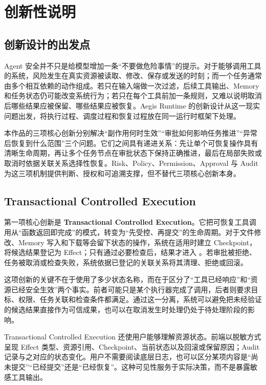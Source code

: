 \chapter{创新性说明}

\section{创新设计的出发点}

Agent 安全并不只是给模型增加一条“不要做危险事情”的提示。对于能够调用工具的系统，风险发生在真实资源被读取、修改、保存或发送的时刻；而一个任务通常由多个相互依赖的动作组成。若只在输入端做一次过滤，后续工具输出、Memory 和任务状态仍可能改变系统行为；若只在每个工具前加一条规则，又难以说明取消后哪些结果应被保留、哪些结果应被恢复。Aegis Runtime 的创新设计从这一现实问题出发，将执行过程、调度过程和恢复过程放在同一运行时框架下处理。

本作品的三项核心创新分别解决“副作用何时生效”“审批如何影响任务推进”“异常后恢复到什么范围”三个问题。它们之间具有递进关系：先让单个可恢复操作具有清晰生命周期，再让多个任务节点在审批状态下保持正确推进，最后在局部失败或取消时依据关联关系选择性恢复。Risk、Policy、Permission、Approval 与 Audit 为这三项机制提供判断、授权和可追溯支撑，但不替代三项核心创新本身。

\section{Transactional Controlled Execution}

第一项核心创新是 \textbf{Transactional Controlled Execution}。它把可恢复工具调用从“函数返回即完成”的模式，转变为“先受控、再提交”的生命周期。对于文件修改、Memory 写入和下载等会留下状态的操作，系统在适用时建立 Checkpoint，将候选结果登记为  Effect；只有通过必要检查后，结果才进入 。若审批被拒绝、任务被取消或检查失败，系统依据已登记的关联关系将其清理、拒绝或回滚。

这项创新的关键不在于使用了多少状态名称，而在于区分了“工具已经响应”和“资源已经安全生效”两个事实。前者可能只是某个执行器完成了调用，后者则要求目标、权限、任务关联和检查条件都满足。通过这一分离，系统可以避免把未经验证的候选结果直接作为可信成果，也可以在取消发生时处理仍处于待处理阶段的影响。

Transactional Controlled Execution 还使用户能够理解资源状态。前端以脱敏方式呈现 Effect 类型、资源引用、Checkpoint、当前状态以及回滚或保留原因；Audit 记录与之对应的状态变化。用户不需要阅读底层日志，也可以区分某项内容是“尚未提交”“已经提交”还是“已经恢复”。这种可见性服务于实际决策，而不是暴露敏感工具输出。


